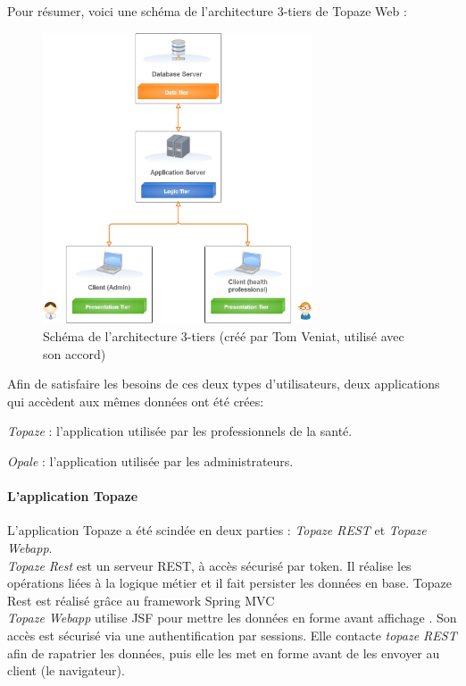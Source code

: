 Pour résumer, voici une schéma de l'architecture 3-tiers de Topaze Web :
\begin{figure}[H]
	\vspace{-10pt}
  \centering
  \includegraphics[width=8cm]{./img/architecture1}
  \caption{\label{fig:mb_va_ast} Schéma de l'architecture 3-tiers (créé par Tom Veniat, utilisé avec son accord)}
\end{figure}

Afin de satisfaire les besoins de ces deux types d'utilisateurs, deux applications qui accèdent aux mêmes données ont été crées: 

\begin{sitemize}
\item \textit{Topaze} : l'application utilisée par les professionnels de la santé. 
\item \textit{Opale} : l'application utilisée par les administrateurs.
\end{sitemize}

\paragraph*{L'application Topaze\\}
L'application Topaze a été scindée en deux parties : \textit{Topaze REST} et \textit{Topaze Webapp}.\\
\textit{Topaze Rest} est un serveur REST, à accès sécurisé par token. Il réalise les opérations liées à la logique métier et il fait persister les données en base. Topaze Rest est réalisé grâce au framework Spring MVC \cite{bib:spring}\\
\textit{Topaze Webapp} utilise JSF pour mettre les données en forme avant affichage \cite{bib:jsf}. Son accès est sécurisé via une authentification par sessions. Elle contacte \textit{topaze REST} afin de rapatrier les données, puis elle les met en forme avant de les envoyer au client (le navigateur).

